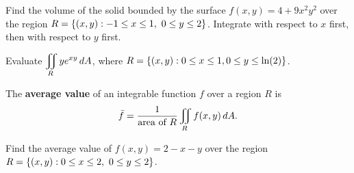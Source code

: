 \documentclass[mathNotesPreamble]{subfiles}
\begin{document}
  \begin{ex*}
    Find the volume of the solid bounded by the surface $f(x,y)=4+9x^2y^2$ over the region $R={\left\{(x,y): -1\leq x\leq 1,\ 0\leq y\leq 2\right\}}$. Integrate with respect to $x$ first, then with respect to $y$ first.
  \end{ex*}
  \pagebreak

  \begin{ex*}
    Evaluate $\displaystyle\iint\limits_R ye^{xy}\,dA$, where $R={\left\{(x,y): 0\leq x\leq 1, 0\leq y\leq \ln(2)\right\}}$.
  \end{ex*}
  \pagebreak

  \begin{defn*}
    The \textbf{average value} of an integrable function $f$ over a region $R$ is
      \[\bar{f}=\frac{1}{\textnormal{area of }R}\iint\limits_R f(x,y)\,dA.\]
  \end{defn*}

  \begin{ex*}
    Find the average value of $f(x,y)=2-x-y$ over the region \newline $R=\set{(x,y): 0\leq x\leq 2,\ 0\leq y\leq 2}$.
  \end{ex*}

  \pagebreak
\end{document}

